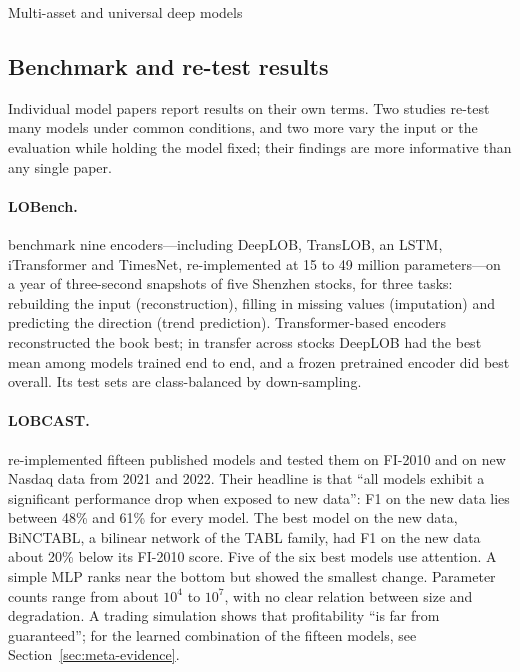 \begin{modelcard}{Multi-asset and universal deep models}
\end{modelcard}

\subsection{Benchmark and re-test results}
\label{sec:benchmarks-dl}

Individual model papers report results on their own terms. Two studies re-test many models under
common conditions, and two more vary the input or the evaluation while holding the model fixed; their
findings are more informative than any single paper.

\paragraph{LOBench.} \citet{zhong2025lobench} benchmark nine encoders---including DeepLOB, TransLOB,
an LSTM, iTransformer and TimesNet, re-implemented at 15 to 49 million parameters---on
a year of three-second snapshots of five Shenzhen stocks, for three tasks: rebuilding the input (reconstruction),
filling in missing values (imputation) and predicting the direction (trend prediction). Transformer-based encoders reconstructed the book best; in transfer across stocks DeepLOB had the
best mean among models trained end to end, and a frozen pretrained encoder did best overall. Its test sets
are class-balanced by down-sampling.

\paragraph{LOBCAST.} \citet{prata2024} re-implemented fifteen published models and tested them on
FI-2010 and on new Nasdaq data from 2021 and 2022. Their headline is that ``all models exhibit a
significant performance drop when exposed to new data'': F1 on the new data lies between 48\% and 61\%
for every model. The best model on the new data, BiNCTABL, a bilinear network of the TABL family, had F1 on the new data
about 20\% below its FI-2010 score. Five of the six best models use attention. A simple MLP ranks near the bottom but showed the
smallest change. Parameter counts range from about $10^4$ to $10^7$, with no clear relation between size and
degradation. A trading simulation shows that profitability ``is far from guaranteed''; for the learned combination of the fifteen
models, see Section~\ref{sec:meta-evidence}.

